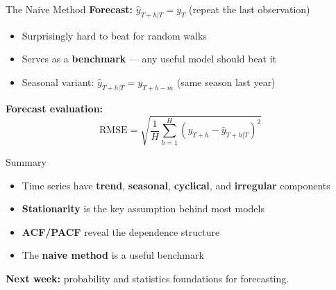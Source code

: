 \documentclass[aspectratio=169, 10pt]{beamer}
\begin{document}
\begin{frame}{The Naive Method}
\textbf{Forecast:} $\hat{y}_{T+h|T} = y_T$ \quad (repeat the last observation)

\vspace{0.5em}
\begin{itemize}
    \item Surprisingly hard to beat for \alert{random walks}
    \item Serves as a \textbf{benchmark} --- any useful model should beat it
    \item Seasonal variant: $\hat{y}_{T+h|T} = y_{T+h-m}$ (same season last year)
\end{itemize}

\vspace{0.5em}
\textbf{Forecast evaluation:}
\[
\text{RMSE} = \sqrt{\frac{1}{H}\sum_{h=1}^{H}\left(y_{T+h} - \hat{y}_{T+h|T}\right)^2}
\]
\end{frame}

\begin{frame}{Summary}
\begin{itemize}
    \item Time series have \textbf{trend}, \textbf{seasonal}, \textbf{cyclical}, and \textbf{irregular} components
    \item \textbf{Stationarity} is the key assumption behind most models
    \item \textbf{ACF/PACF} reveal the dependence structure
    \item The \textbf{naive method} is a useful benchmark
\end{itemize}

\vspace{0.5em}
\textbf{Next week:} probability and statistics foundations for forecasting.
\end{frame}
\end{document}
